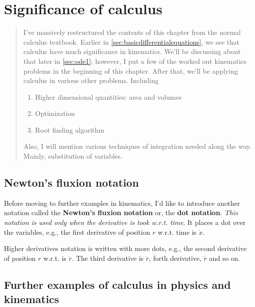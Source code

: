 \chapter{Significance of calculus}
\label{sec:significanceofcalculus}

\begin{abstract}
    I've massively restructured the contents of this chapter from the normal calculus textbook. Earlier in \cref{sec:basicdifferentialequations}, we see that calculus have much significance in kinematics. We'll be discussing about that later in \cref{sec:ode1}; however, I put a few of the worked out kinematics problems in the beginning of this chapter. After that, we'll be applying calculus in various other problems. Including
    \begin{enumerate}[noitemsep]
        \item Higher dimensional quantities: area and volumes
        \item Optimization
        \item Root finding algorithm
    \end{enumerate}

    Also, I will mention various techniques of integration needed along the way. Mainly, substitution of variables.

\end{abstract}

\section{Newton's fluxion notation}
\label{sec:newtons_fluxion_notation}

Before moving to further examples in kinematics, I'd like to introduce another notation called the \textbf{Newton's fluxion notation} or, the \textbf{dot notation}. \emph{This notation is used only when the derivative is took w.r.t. time}. It places a dot over the variables, e.g., the first derivative of position $r$ w.r.t. time is $\dot{x}$.

Higher derivatives notation is written with more dots, e.g., the second derivative of position $r$ w.r.t. is $\ddot{r}$. The third derivative is $\dddot{r}$, forth derivative, $\ddddot{r}$ and so on.

\section{Further examples of calculus in physics and kinematics}

